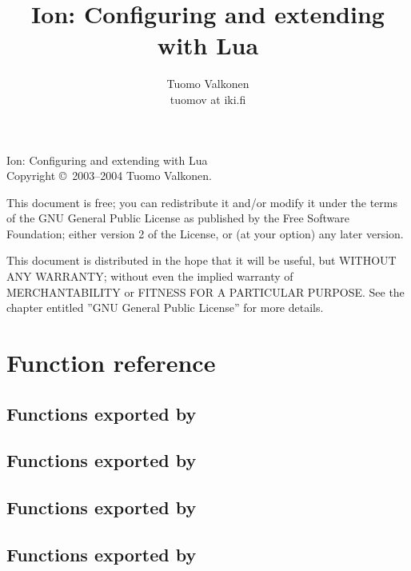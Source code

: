 \documentclass[english,a4paper,11pt,oldtoc,mctitle]{rapport3}
\title{Ion: Configuring and extending with Lua}
\author{Tuomo Valkonen \\ tuomov at iki.fi}
\begin{document}
\maketitle

Ion: Configuring and extending with Lua\\
Copyright \copyright\  2003--2004 Tuomo Valkonen.

This document is free; you can redistribute it and/or modify
it under the terms of the GNU General Public License as published by
the Free Software Foundation; either version 2 of the License, or
(at your option) any later version.

This document is distributed in the hope that it will be useful,
but WITHOUT ANY WARRANTY; without even the implied warranty of
MERCHANTABILITY or FITNESS FOR A PARTICULAR PURPOSE.  See the
chapter entitled ''GNU General Public License'' for more details.

\tableofcontents











\chapter{Function reference}
\label{sec:exports}

\section{Functions exported by }
\label{sec:ioncoreref}


\section{Functions exported by }
\label{sec:ionwsref}


\section{Functions exported by }
\label{sec:floatwsref}


\section{Functions exported by }
\label{sec:queryref}

\end{document}
